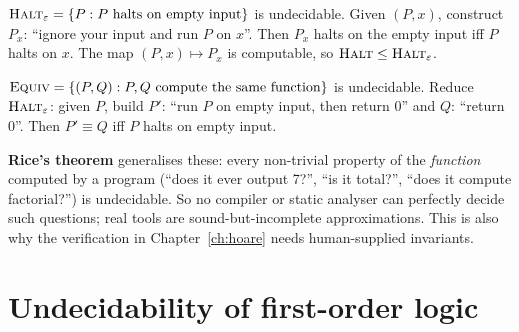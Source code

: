 \begin{center}
\end{center}

\begin{example}
$\textsc{Halt}_\varepsilon=\{P : P \text{ halts on empty input}\}$ is undecidable. Given
$(P,x)$, construct $P_x$: ``ignore your input and run $P$ on $x$''. Then $P_x$ halts on
the empty input iff $P$ halts on $x$. The map $(P,x)\mapsto P_x$ is computable, so
$\textsc{Halt}\le\textsc{Halt}_\varepsilon$.
\end{example}

\begin{example}
$\textsc{Equiv}=\{(P,Q): P,Q \text{ compute the same function}\}$ is undecidable. Reduce
$\textsc{Halt}_\varepsilon$: given $P$, build $P'$: ``run $P$ on empty input, then return
$0$'' and $Q$: ``return $0$''. Then $P'\equiv Q$ iff $P$ halts on empty input.
\end{example}

\begin{aside}
\textbf{Rice's theorem} generalises these: every non-trivial property of the
\emph{function} computed by a program (``does it ever output 7?'', ``is it total?'',
``does it compute factorial?'') is undecidable. So no compiler or static analyser can
perfectly decide such questions; real tools are sound-but-incomplete approximations. This
is also why the verification in Chapter~\ref{ch:hoare} needs human-supplied invariants.
\end{aside}

\section{Undecidability of first-order logic}

